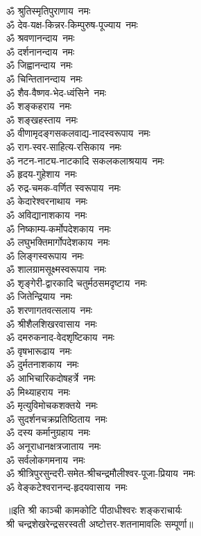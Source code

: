 \begin{flushleft}
\begin{multicols}{2}
ॐ श्रुतिस्मृतिपुराणाय~नमः\\
ॐ देव-यक्ष-किन्नर-किम्पुरुष-पूज्याय~नमः\\
ॐ श्रवणानन्दाय~नमः\\
ॐ दर्शनानन्दाय~नमः\\
ॐ जिह्वानन्दाय~नमः\\
ॐ चिन्तितानन्दाय~नमः\\
ॐ शैव-वैष्णव-भेद-ध्वंसिने~नमः\\
ॐ शङ्कहराय~नमः\hfill{}\\
ॐ शङ्खहस्ताय~नमः\\
ॐ वीणामृदङ्गसकलवाद्य-नादस्वरूपाय~नमः\\
ॐ राग-स्वर-साहित्य-रसिकाय~नमः\\
ॐ नटन-नाट्य-नाटकादि सकलकलाश्रयाय~नमः\\
ॐ हृदय-गुहेशाय~नमः\\
ॐ रुद्र-चमक-वर्णित स्वरूपाय~नमः\\
ॐ केदारेश्वरनाथाय~नमः\\
ॐ अविद्यानाशकाय~नमः\\
ॐ निष्काम्य-कर्मोपदेशकाय~नमः\\
ॐ लघुभक्तिमार्गोपदेशकाय~नमः\hfill{}\\
ॐ लिङ्गस्वरूपाय~नमः\\
ॐ शालग्रामसूक्ष्मस्वरूपाय~नमः\\
ॐ शृङ्गेरी-द्वारकादि चतुर्मठसमदृष्टाय~नमः\\
ॐ जितेन्द्रियाय~नमः\\
ॐ शरणागतवत्सलाय~नमः\\
ॐ श्रीशैलशिखरवासाय~नमः\\
ॐ दमरुकनाद-वेदशृष्टिकाय~नमः\\
ॐ वृषभारूढाय~नमः\\
ॐ दुर्मतनाशकाय~नमः\\
ॐ आभिचारिकदोषहर्त्रे~नमः\hfill{}\\
ॐ मिथ्याहराय~नमः\\
ॐ मृत्युविमोचकशक्तये~नमः\\
ॐ सुदर्शनचक्रप्रतिष्ठिताय~नमः\\
ॐ दस्य कर्मानुग्रहाय~नमः\\
ॐ अनूराधानक्षत्रजाताय~नमः\\
ॐ सर्वलोकगमनाय~नमः\\
ॐ श्रीत्रिपुरसुन्दरी-समेत-श्रीचन्द्रमौलीश्वर-पूजा-प्रियाय~नमः\\
ॐ वेङ्कटेश्वरानन्द-हृदयवासाय~नमः\\
\end{multicols}
\end{flushleft}
॥इति श्री काञ्ची कामकोटि पीठाधीश्वरः शङ्कराचार्यः\\ श्री चन्द्रशेखरेन्द्रसरस्वती अष्टोत्तर-शतनामावलिः सम्पूर्णा॥
